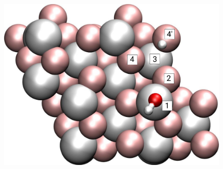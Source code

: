 \documentclass[hyperref={pdfpagelabels=false}]{beamer}
\begin{document}
\begin{frame}
\begin{columns}
\begin{figure}
\includegraphics[width=1.\textwidth]{figures/0001_1-4p-diss_top_label.pdf}
\end{figure}
\end{columns}   
\end{frame}
\end{document}
